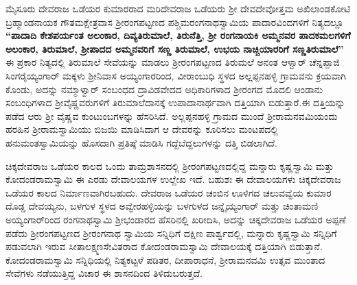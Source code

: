 ಮೈಸೂರು ದೇವರಾಜ ಒಡೆಯರ ಕುಮಾರರಾದ ಮರಿದೇವರಾಜ ಒಡೆಯರು ಶ‍್ರೀ ದೇವದೇವೋತ್ತಮ ಅಖಿಲಾಂಡಕೋಟಿ ಬ್ರಹ್ಮಾಂಡನಾಯಕ ಗೌತಮಕ್ಷೇತ್ರವಾಸ ಶ‍್ರೀರಂಗಪಟ್ಟಣದ ಪಶ್ಚಿಮರಂಗನಾಥಸ್ವಾಮಿಯ ಪಾದಾರವಿಂದಗಳಿಗೆ ನಿತ್ಯದಲ್ಲೂ \textbf{“ಪಾದಾದಿ ಕೇಶಪರ್ಯಂತ ಅಲಂಕಾರ, ದಿವ್ಯತಿರುಮಾಲೆ, ತಿರುನೆತ್ತಿ, ಶ‍್ರೀ ರಂಗನಾಯಕಿ ಅಮ್ಮನವರ ಪಾದಕಮಲಗಳಿಗೆ ಅಲಂಕಾರ, ತಿರುಮಾಲೆ, ಶ‍್ರೀಪಾದದ ಅಮ್ಮನವರಿಗೆ ಸಣ್ಣ ತಿರುಮಾಲೆ, ಉಭಯ ನಾಚ್ಚಿಯಾರರಿಗೆ ಸಣ್ಣತಿರುಮಾಲೆ”} ಈ ಪ್ರಕಾರ ನಿತ್ಯದಲ್ಲಿ ತಿರುಮಾಲೆ ಸೇವೆಯನ್ನು ಮಾಡಲು ಶ‍್ರೀರಂಗಪಟ್ಟಣದ ತಿರುಮಲೆ ಅನಂತ ಆಳ್ವಾರ್​ ಚೆನ್ನಪ್ಪಾಜಿ ಸಿಂಗರೈಯ್ಯಂಗಾರ್​ ಮಕ್ಕಳು ಶ‍್ರೀನಿವಾಸ ಅಯ್ಯಂಗಾರರಿಂದ, ವೀರಾಂಬುಧಿ ಸ್ಥಳದ ಅಲ್ಲಪ್ಪನಹಳ್ಳಿ ಗ್ರಾಮವನು ಕ್ರಯವಾಗಿ ಕೊಂಡು, ಅದನ್ನು ನಮ್ಮಾಳ್ವಾರ್​ ಸಂಬಂಧದ ದ್ರಾವಿಡವೇದದ ಅಧಿಕಾರಿಗಳಾದ ಶ‍್ರೀರಂಗದ ಮೊದಲಿ ಆಂಡಾನು ಸಂಬಂಧಿಗಳಾದ ಶ‍್ರೀವೈಷ್ಣವರುಗಳಿಗೆ ತಿರುಮಾಲೆದಾನಕ್ಕೆ ಉಪಾದಾನಾರ್ಥವಾಗಿ ದತ್ತಿಯಾಗಿ ಬಿಡುತ್ತಾರೆ.ಈ ದತ್ತಿಯನ್ನು ಪಡೆದ ಆರು ಶ‍್ರೀ ವೈಷ್ಣವ ಕುಂಟುಂಬಗಳನ್ನು ಹೆಸರಿಸಿದೆ. ಅಲ್ಲಪ್ಪನಹಳ್ಳಿ ಗ್ರಾಮದ ಮುಂದೆ ಶ‍್ರೀರಾಮನವಮಿಯಂದು ಹರಹಿನ ಶ‍್ರೀರಾಮಸ್ವಾಮಿಯು ಬಿಜಯಿ ಮಾಡಿಸಿದಾಗ ಆ ದೇವರನ್ನು ಕೂರಿಸಲು ಮಂಟಪದಲ್ಲಿ ಹನುಮಂತಸ್ವಾಮಿಯನ್ನು ಹೊಸದಾಗಿ ಪ್ರತಿಷ್ಠೆ ಮಾಡಿಸಿ ಗದ್ದೆಬೆದ್ದಲುಗಳನ್ನು ದತ್ತಿ ಬಿಡಲಾಗಿದೆ.

ಚಿಕ್ಕದೇವರಾಜ ಒಡೆಯರ ಕಾಲದ ಒಂದು ತಾಮ್ರಶಾಸನದಲ್ಲಿ ಶ‍್ರೀರಂಗಪಟ್ಟಣದಲ್ಲಿದ್ದ ಮನ್ನಾರು ಕೃಷ್ಣಸ್ವಾಮಿ ಮತ್ತು ಕೋದಂಡರಾಮಸ್ವಾಮಿ ಈ ಎರಡು ದೇವಾಲಯಗಳ ಉಲ್ಲೇಖ ಇದೆ. ಬಹುಶಃ ಈ ದೇವಾಲಯಗಳು ಚಿಕ್ಕದೇವರಾಜ ಒಡೆಯರ ಕಾಲದ ನಿರ್ಮಾಣವಾಗಿರಬಹುದು. ದೇವರಾಜ ಒಡೆಯರ ಚಂಬಿನ ಊಳಿಗದ ಚಲುವವ್ವೆಯ ಕುಮಾರ ದೊಡ್ಡ ದೇವಯ್ಯನು, ಬಳಗುಳ ಸ್ಥಳದ ಅವ್ವೇರಹಳ್ಳಿಯನ್ನು ಬಳಗುಳದ ಜನ್ನೈಯ್ಯಂಗಾರ್​ ಮತ್ತು ಚಿಂತಾಮಣಿ ಅಯ್ಯಂಗಾರ್​ರಿಂದ ರಂಗನಾಥಸ್ವಾಮಿ ಶ‍್ರೀಭಂಡಾರದ ಹೆಸರಿನಲ್ಲಿ ಖರೀದಿಸಿ, ಅದನ್ನು ಚಿಕ್ಕದೇವರಾಜ ಒಡೆಯರ ಅಪ್ಪಣೆ ಪಡೆದು ಶ‍್ರೀರಂಗಪಟ್ಟಣದ ಶ‍್ರೀರಂಗನಾಥ ಸ್ವಾಮಿಯ ಸನ್ನಿಧಿಗೆ ದಕ್ಷಿಣ ಪಾರ್ಶ್ವದಲ್ಲಿ, ಮನ್ನಾರು ಕೃಷ್ಣಸ್ವಾಮಿ ಸನ್ನಿಧಿಗೆ ಪಡುವಲಾಗಿ ಇರುವ ಸೀತಾಲಕ್ಷ್ಮಣಸೇವಿತರಾದ ಕೋದಂಡರಾಮಸ್ವಾಮಿ ದೇವಾಲಯಕ್ಕೆ ದತ್ತಿಯಾಗಿ ಬಿಡುತ್ತಾನೆ. ಕೋದಂಡರಾಮಸ್ವಾಮಿ ಸನ್ನಿಧಿಯಲ್ಲಿ ನಿತ್ಯಕಟ್ಟಳೆ ಪಡಿತರ, ದೀಪಾರಾಧನೆ, ಶ‍್ರೀರಾಮನವಮಿ ಉತ್ಸವ ಮುಂತಾದ ಸೇವೆಗಳು ನಡೆಯುತ್ತಿದ್ದ ವಿಚಾರ ಈ ಶಾಸನದಿಂದ ತಿಳಿದುಬರುತ್ತದೆ.

